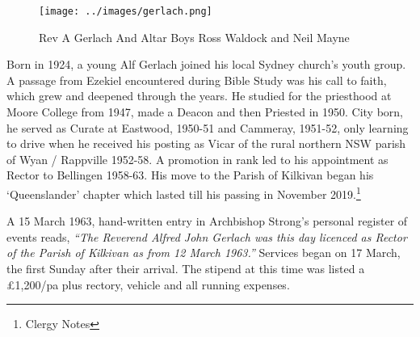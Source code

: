 \begin{figure}[!htb]
\begin{center}
\texttt{[image: ../images/gerlach.png]}
\caption{Rev A Gerlach And Altar Boys Ross Waldock and Neil Mayne}
\end{center}
\end{figure}




Born in 1924, a young Alf Gerlach joined his local Sydney church's youth group. A passage from Ezekiel encountered during Bible Study was his call to faith, which grew and deepened through the years. He studied for the priesthood at Moore College from 1947, made a Deacon and then Priested in 1950. City born, he served as Curate at Eastwood, 1950-51 and Cammeray, 1951-52, only learning to drive when he received his posting as Vicar of the rural northern NSW parish of Wyan / Rappville 1952-58. A promotion in rank led to his appointment as Rector to Bellingen 1958-63. His move to the Parish of Kilkivan began his `Queenslander' chapter which lasted till his passing in November 2019.\footnote{Clergy Notes}


A 15 March 1963, hand-written entry in Archbishop Strong's personal register of events reads, \emph{``The Reverend Alfred John Gerlach was this day licenced as Rector of the Parish of Kilkivan as from 12 March 1963.''} Services began on 17 March, the first Sunday after their arrival. The stipend at this time was listed a \pounds1,200/pa plus rectory, vehicle and all running expenses.









